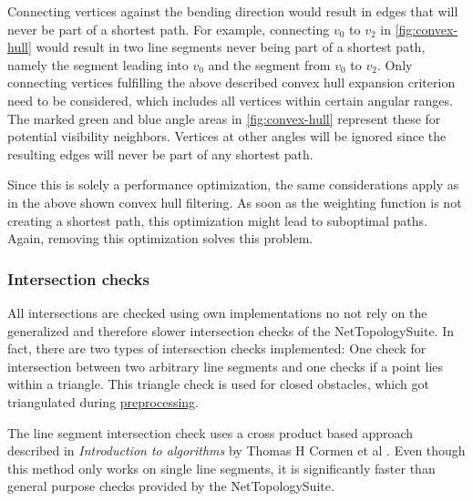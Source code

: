 			Connecting vertices against the bending direction would result in edges that will never be part of a shortest path.
			For example, connecting $v_0$ to $v_2$ in \cref{fig:convex-hull} would result in two line segments never being part of a shortest path, namely the segment leading into $v_0$ and the segment from $v_0$ to $v_2$. 
			Only connecting vertices fulfilling the above described convex hull expansion criterion need to be considered, which includes all vertices within certain angular ranges.
			The marked green and blue angle areas in \cref{fig:convex-hull} represent these  for potential visibility neighbors.
			Vertices at other angles will be ignored since the resulting edges will never be part of any shortest path.
			
			Since this is solely a performance optimization, the same considerations apply as in the above shown convex hull filtering.
			As soon as the weighting function is not creating a shortest path, this optimization might lead to suboptimal paths.
			Again, removing this optimization solves this problem.
			
		\subsubsection{Intersection checks}
		\label{subsubsec:intersection-checks}
			
			All intersections are checked using own implementations no not rely on the generalized and therefore slower intersection checks of the NetTopologySuite.
			In fact, there are two types of intersection checks implemented:
			One check for intersection between two arbitrary line segments and one checks if a point lies within a triangle.
			This triangle check is used for closed obstacles, which got triangulated during \hyperref[subsec:step-1-preprocessing]{preprocessing}.
			
			The line segment intersection check uses a cross product based approach described in \emph{Introduction to algorithms} by Thomas H Cormen et al \cite[1018]{cormen-introduction-to-alg}.
			Even though this method only works on single line segments, it is significantly faster than general purpose checks provided by the NetTopologySuite.
			
